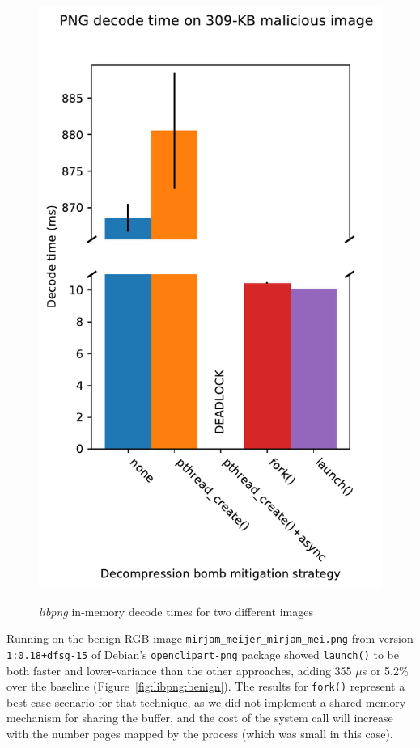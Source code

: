 \begin{figure}[t]
\begin{minipage}{0.48\textwidth}
	\includegraphics[width=\textwidth]{figs/cerberus2_nns16_surplus256k_10K}
	\label{fig:libpng:bomb}
	\end{minipage}
\caption{\textit{libpng} in-memory decode times for two different images}
\end{figure}

Running on the benign RGB image \texttt{mirjam\_meijer\_mirjam\_mei.png} from version
\texttt{1:0.18+dfsg-15} of Debian's \texttt{openclipart-png} package showed
\texttt{launch()} to be both faster and lower-variance than the other approaches,
adding 355 $\mu$s or 5.2\% over the baseline (Figure~\ref{fig:libpng:benign}).  The
results for \texttt{fork()} represent a best-case scenario for that technique, as we
did not implement a shared memory mechanism for sharing the buffer, and the cost of
the system call will increase with the number pages mapped by the process (which was
small in this case).

